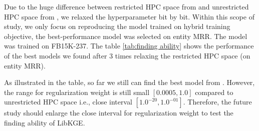 \begin{table}[!htbp]
\centering
{}
\caption[Model performance when relaxing the restricted HPC space]{Model performance when relaxing the restricted HPC space. \textit{Trial} indicates the id of trial, \textit{Hyperparameters} are the hyperparameters we attempted to relax with their correspoding values in \textit{Value} column. Entity MRR indicates the MRR that best model can achieved.}
\label{tab:finding ability}
\end{table}

Due to the huge difference between restricted HPC space from \cite{chen2021relation} and unrestricted HPC space from \cite{Ruffinelli2020You}, we relaxed the hyperparameter bit by bit. Within this scope of study, we only focus on reproducing the model trained on hybrid training objective, the best-performance model was selected on entity MRR. The model was trained on FB15K-237. The table \ref{tab:finding ability} shows the performance of the best models we found after 3 times relaxing the restricted HPC space (on entity MRR). 

As illustrated in the table, so far we still can find the best model from \cite{chen2021relation}. However, the range for regularization weight is still small $[0.0005, 1.0]$ compared to unrestricted HPC space i.e., close interval $[1.0^{-20}, 1.0^{-01}]$. Therefore, the future study should enlarge the close interval for regularization weight to test the finding ability of LibKGE.
